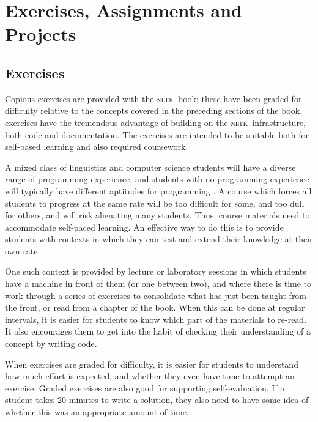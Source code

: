 \documentclass[11pt]{article}
\newcommand{\NLTK}{\textsc{nltk}}
\begin{document}
\section{Exercises, Assignments and Projects}
\label{sec:projects}

\subsection{Exercises}

Copious exercises are provided with the \NLTK\ book; these
have been graded for difficulty relative to the concepts covered in the
preceding sections of the book.  exercises have the tremendous advantage of
building on the \NLTK\ infrastructure, both code and
documentation. The exercises are intended to be suitable both for
self-based learning and also required coursework.

A mixed class of linguistics and computer science students will have a
diverse range of programming experience, and students with no
programming experience will typically have different aptitudes for
programming \cite{Caspersen07}.  A course which forces all students to
progress at the same rate will be too difficult for some, and too dull
for others, and will risk alienating many students.  Thus, course
materials need to accommodate self-paced learning.  An effective way
to do this is to provide students with contexts in which they can test
and extend their knowledge at their own rate.

One such context is provided by lecture or laboratory sessions in
which students have a machine in front of them (or one between two),
and where there is time to work through a series of exercises to
consolidate what has just been taught from the front, or read from a
chapter of the book. When this can be done at regular intervals, it is easier for
students to know which part of the materials to re-read.  It also
encourages them to get into the habit of checking their understanding of a concept by writing
code.

When exercises are graded for difficulty, it is easier for students to
understand how much effort is expected, and whether they even have
time to attempt an exercise.  Graded exercises are also good for
supporting self-evaluation.  If a student takes 20 minutes to write a
solution, they also need to have some idea of whether this was an
appropriate amount of time.

\end{document}

